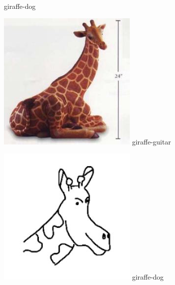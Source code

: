 \documentclass{article}
\begin{document}
\begin{center}
\begin{minipage}{0.142\textwidth}
        giraffe-dog
    \end{minipage}%
    \begin{minipage}{0.142\textwidth}
        \includegraphics[width=\linewidth]{./pic/misclassified_r2_p3_2723.jpg}
        giraffe-guitar
    \end{minipage}%
    \begin{minipage}{0.142\textwidth}
        \includegraphics[width=\linewidth]{./pic/misclassified_r2_p0_1641.jpg}
        giraffe-dog
    \end{minipage}%


\end{center}
\end{document}
